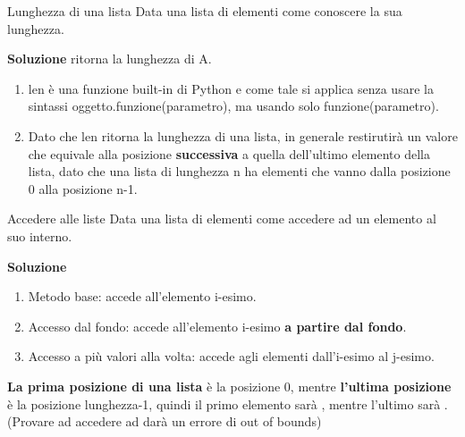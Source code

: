 \documentclass[10pt]{extarticle}
\makeatletter
\newcommand{\<}{\langle}
\renewcommand{\>}{\rangle}
\renewenvironment{proof}[1][\proofname] {\par\pushQED{\qed}
\renewcommand*{\proofname}{Soluzione}
{\normalfont\sffamily\bfseries\topsep6\p@\@plus6\p@\relax #1\@addpunct{.} }}{\popQED\endtrivlist\@endpefalse}
\theoremstyle{mystyle}{\newtheorem*{remark}{Nota}}
\theoremstyle{mystyle}{\newtheorem*{remarks}{Note}}
\theoremstyle{mystyle}{\newtheorem*{example}{Esempio}}
\theoremstyle{mystyle}{\newtheorem*{examples}{Esempi}}
\theoremstyle{definition}{\newtheorem*{exercise}{Exercise}}
\theoremstyle{warn}
\makeatother
\begin{document}
\begin{definition}{Lunghezza di una lista}{}
Data una lista di elementi  come conoscere la sua lunghezza.
\end{definition}
\begin{proof}
 ritorna la lunghezza di A.
\end{proof}
\begin{remarks} \leavevmode
\begin{enumerate}
    \item len è una funzione built-in di Python e come tale si applica senza usare la sintassi oggetto.funzione(parametro), ma usando solo funzione(parametro).
    \item Dato che len ritorna la lunghezza di una lista, in generale restirutirà un valore che equivale alla posizione \textbf{successiva} a quella dell'ultimo elemento della lista, dato che una lista di lunghezza n ha elementi che vanno dalla posizione 0 alla posizione n-1.
\end{enumerate}
\end{remarks}

\begin{definition}{Accedere alle liste}{}
Data una lista di elementi  come accedere ad un elemento al suo interno.
\end{definition}
\begin{proof}
\begin{enumerate}
    \item Metodo base:  accede all'elemento i-esimo.
    \item Accesso dal fondo:  accede all'elemento i-esimo \textbf{a partire dal fondo}.
    \item Accesso a più valori alla volta:   accede agli elementi dall'i-esimo al j-esimo.
\end{enumerate}
\end{proof}
\begin{remark}
\textbf{La prima posizione di una lista} è la posizione 0, mentre \textbf{l'ultima posizione} è la posizione lunghezza-1, quindi il primo elemento sarà , mentre l'ultimo sarà . (Provare ad accedere ad  darà un errore di out of bounds)
\end{remark}
\end{document}
